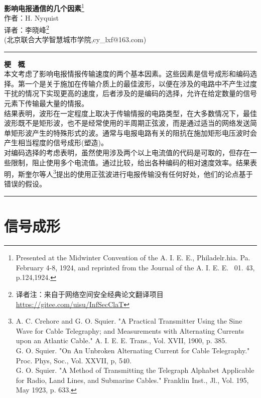 \documentclass{hfutpaper}
\begin{document}
\begin{center}
\LARGE
  \textbf{影响电报通信的几个因素}\footnote{Presented at the Midwinter Convention of the A. I. E. E., Philadelr.hia. Pa.	February 4-8, 1924, and reprinted from the Journal of the A. I. E. E. \ 01. 43, p.124,1924.}\\
  \vspace{0.2em}
  \large
    作者：H. Nyquist \\
    
  {\small 译者：李晓峰}\footnote{译者注：来自于网络空间安全经典论文翻译项目\url{https://gitee.com/uisu/InfSecClaT}}\\
  {\small (北京联合大学智慧城市学院,cy\_lxf@163.com)}\\
  
  \end{center}
\rule[0.1\baselineskip]{\textwidth}{0.5pt}
\textbf{梗 \ 概}\\
\large
本文考虑了影响电报情报传输速度的两个基本因素。这些因素是信号成形和编码选择。第一个是关于施加在传输介质上的最佳波形，以便在涉及的电路中不产生过度干扰的情况下实现更高的速度，后者涉及的是编码的选择，允许在给定数量的信号元素下传输最大量的情报。\\
结果表明，波形在一定程度上取决于传输情报的电路类型，在大多数情况下，最佳波形既不是矩形波，也不是经常使用的半周期正弦波，而是通过适当的网络发送简单矩形波产生的特殊形式的波。通常与电报电路有关的阻抗在施加矩形电压波时会产生相当程度的信号成形(塑造)。\\
对编码选择的考虑表明，虽然使用涉及两个以上电流值的代码是可取的，但存在一些限制，阻止使用多个电流值。通过比较，给出各种编码的相对速度效率。结果表明，斯奎尔等人\footnote{
	A. C. Crehore and G. O. Squier. "A Practical Transmitter Using the Sine	Wave for Cable Telegraphy; and Measurements with Alternating Currents upon an Atlantic Cable." A. I. E. E. Trans., Vol. XVII, 1900, p. 385.\\
	G. O. Squier. "On An Unbroken Alternating Current for Cable Telegraphy."
	Proc. Phys, Soc., Vol. XXVII, p, 540.\\
	G. O. Squier. "A Method of Transmitting the Telegraph Alphabet Applicable
	for Radio, Land Lines, and Submarine Cables." Franklin Inst., Jl., Vol. 195, May
	1923, p. 633.
}提出的使用正弦波进行电报传输没有任何好处，他们的论点基于错误的假设。
\\
\rule[0.1\baselineskip]{\textwidth}{0.5pt}
\section{信号成形}
\end{document}
